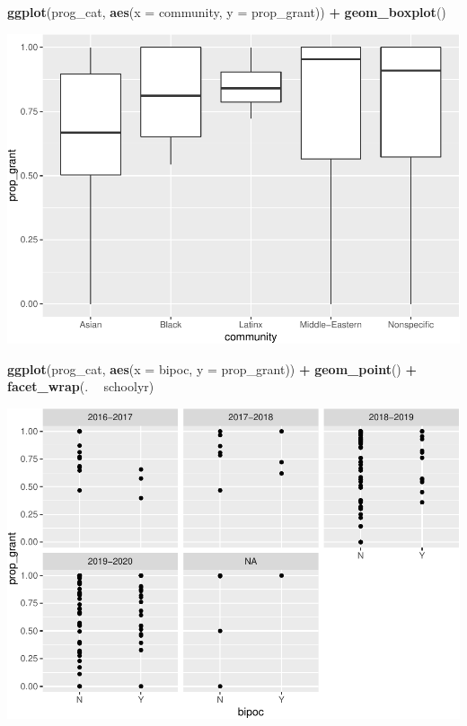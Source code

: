 \documentclass[]{article}
\newenvironment{Shaded}{\begin{snugshade}}{\end{snugshade}}
\newcommand{\DataTypeTok}[1]{\textcolor[rgb]{0.13,0.29,0.53}{#1}}
\newcommand{\KeywordTok}[1]{\textcolor[rgb]{0.13,0.29,0.53}{\textbf{#1}}}
\newcommand{\NormalTok}[1]{#1}
\newcommand{\OperatorTok}[1]{\textcolor[rgb]{0.81,0.36,0.00}{\textbf{#1}}}
\newcommand{\StringTok}[1]{\textcolor[rgb]{0.31,0.60,0.02}{#1}}
\begin{document}
\begin{Shaded}
\begin{Highlighting}[]
\KeywordTok{ggplot}\NormalTok{(prog_cat, }\KeywordTok{aes}\NormalTok{(}\DataTypeTok{x =}\NormalTok{ community, }\DataTypeTok{y =}\NormalTok{ prop_grant)) }\OperatorTok{+}
\StringTok{  }\KeywordTok{geom_boxplot}\NormalTok{()}
\end{Highlighting}
\end{Shaded}

\includegraphics{sofc-funding_files/figure-latex/unnamed-chunk-6-1.pdf}

\begin{Shaded}
\begin{Highlighting}[]
\KeywordTok{ggplot}\NormalTok{(prog_cat, }\KeywordTok{aes}\NormalTok{(}\DataTypeTok{x =}\NormalTok{ bipoc, }\DataTypeTok{y =}\NormalTok{ prop_grant)) }\OperatorTok{+}
\StringTok{  }\KeywordTok{geom_point}\NormalTok{() }\OperatorTok{+}
\StringTok{  }\KeywordTok{facet_wrap}\NormalTok{(. }\OperatorTok{~}\StringTok{ }\NormalTok{schoolyr)}
\end{Highlighting}
\end{Shaded}

\includegraphics{sofc-funding_files/figure-latex/unnamed-chunk-6-2.pdf}
\end{document}
